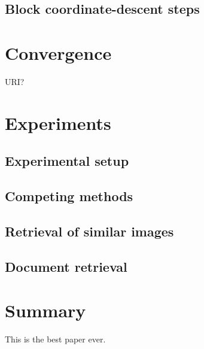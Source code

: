 \documentclass{article}
\begin{document}
\subsection{Block coordinate-descent steps}




\section{Convergence}
URI?

\section{Experiments}
\subsection{Experimental setup}
\subsection{Competing methods}
\subsection{Retrieval of similar images}
\subsection{Document retrieval}


\section{Summary}
This is the best paper ever.






\end{document}
